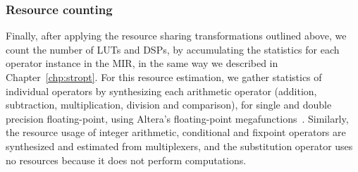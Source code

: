 \subsubsection{Resource counting}

Finally, after applying the resource sharing transformations outlined
above, we count the number of LUTs and DSPs, by accumulating the statistics
for each operator instance in the MIR, in the same way we described
in Chapter~\ref{chp:stropt}.  For this resource estimation, we gather
statistics of individual operators by synthesizing each arithmetic operator
(addition, subtraction, multiplication, division and comparison), for
single and double precision floating-point, using Altera's floating-point
megafunctions~\cite{altfp}.  Similarly, the resource usage of integer
arithmetic, conditional and fixpoint operators are synthesized and estimated
from multiplexers, and the substitution operator uses no resources because it
does not perform computations.
